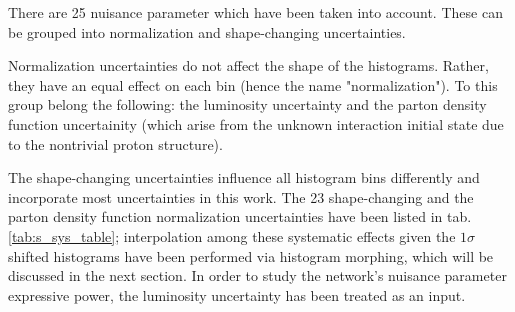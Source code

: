 
There are 25 nuisance parameter which have been taken into account. These can be grouped into normalization and shape-changing uncertainties.

Normalization uncertainties do not affect the shape of the histograms. Rather, they have an equal effect on each bin (hence the name "normalization"). To this group belong the following: the luminosity uncertainty and the parton density function uncertainity (which arise from the unknown interaction initial state due to the nontrivial proton structure).

The shape-changing uncertainties influence all histogram bins differently and incorporate most uncertainties in this work. The 23 shape-changing and the parton density function normalization uncertainties have been listed in tab. \ref{tab:s_sys_table}; interpolation among these systematic effects given the $1\sigma$ shifted histograms have been performed via histogram morphing, which will be discussed in the next section. In order to study the network's nuisance parameter expressive power, the luminosity uncertainty has been treated as an input.

